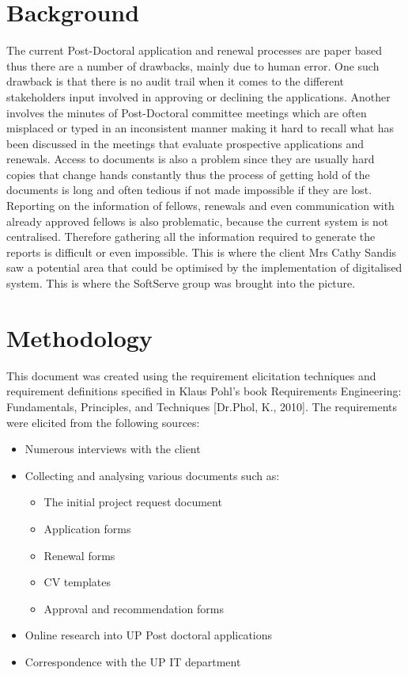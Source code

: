 \documentclass[12pt]{article}
\begin{document}
\section{Background} %
\vspace{0.2in}
The current Post-Doctoral application and renewal processes are paper based thus there are a number of drawbacks, mainly due to human error. One such drawback is that there is no audit trail when it comes to the different stakeholders input involved in approving or declining the applications. Another involves the minutes of Post-Doctoral committee meetings which are often misplaced or typed in an inconsistent manner making it hard to recall what has been discussed in the meetings that evaluate prospective applications and renewals. Access to documents is also a problem since they are usually hard copies that change hands constantly thus the process of getting hold of the documents is long and often tedious if not made impossible if they are lost. Reporting on the information of fellows, renewals and even communication with already approved fellows is also problematic, because the current system is not centralised. Therefore gathering all the information required to generate the reports is difficult or even impossible. This is where the client Mrs Cathy Sandis saw a potential area that could be optimised by the implementation of digitalised system. This is where the SoftServe group was brought into the picture.
\vspace{0.5in}

\newpage
\section{Methodology} %
\vspace{0.2in}

This document was created using the requirement elicitation techniques and requirement definitions specified in Klaus Pohl’s book Requirements Engineering: Fundamentals, Principles, and Techniques [Dr.Phol, K., 2010].
The requirements were elicited from the following sources:
\begin{itemize}
\item Numerous interviews with the client
\item Collecting and analysing various documents such as:
\begin{itemize}
\item The initial project request document
\item Application forms
\item Renewal forms
\item CV templates
\item Approval and recommendation forms
\end{itemize}	
\item Online research into UP Post doctoral applications
\item Correspondence with the UP IT department
\end{itemize}	
\end{document}
